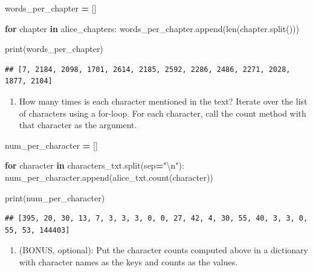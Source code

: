 \documentclass[
]{book}
\newenvironment{Shaded}{\begin{snugshade}}{\end{snugshade}}
\newcommand{\BuiltInTok}[1]{#1}
\newcommand{\CharTok}[1]{\textcolor[rgb]{0.31,0.60,0.02}{#1}}
\newcommand{\ControlFlowTok}[1]{\textcolor[rgb]{0.13,0.29,0.53}{\textbf{#1}}}
\newcommand{\KeywordTok}[1]{\textcolor[rgb]{0.13,0.29,0.53}{\textbf{#1}}}
\newcommand{\NormalTok}[1]{#1}
\newcommand{\OperatorTok}[1]{\textcolor[rgb]{0.81,0.36,0.00}{\textbf{#1}}}
\newcommand{\StringTok}[1]{\textcolor[rgb]{0.31,0.60,0.02}{#1}}
\providecommand{\tightlist}{%
  \setlength{\itemsep}{0pt}\setlength{\parskip}{0pt}}
\begin{document}
\begin{Shaded}
\begin{Highlighting}[]
\NormalTok{words\_per\_chapter }\OperatorTok{=}\NormalTok{ []}

\ControlFlowTok{for}\NormalTok{ chapter }\KeywordTok{in}\NormalTok{ alice\_chapters:}
\NormalTok{    words\_per\_chapter.append(}\BuiltInTok{len}\NormalTok{(chapter.split()))}

\BuiltInTok{print}\NormalTok{(words\_per\_chapter)}
\end{Highlighting}
\end{Shaded}

\begin{verbatim}
## [7, 2184, 2098, 1701, 2614, 2185, 2592, 2286, 2486, 2271, 2028, 1877, 2104]
\end{verbatim}

\begin{enumerate}
\def\labelenumi{\arabic{enumi}.}
\setcounter{enumi}{2}
\tightlist
\item
  How many times is each character mentioned in the text?
  Iterate over the list of characters using a for-loop.
  For each character, call the count method with that character as the argument.
\end{enumerate}

\begin{Shaded}
\begin{Highlighting}[]
\NormalTok{num\_per\_character }\OperatorTok{=}\NormalTok{ []}

\ControlFlowTok{for}\NormalTok{ character }\KeywordTok{in}\NormalTok{ characters\_txt.split(sep}\OperatorTok{=}\StringTok{"}\CharTok{\textbackslash{}n}\StringTok{"}\NormalTok{):}
\NormalTok{    num\_per\_character.append(alice\_txt.count(character))}

\BuiltInTok{print}\NormalTok{(num\_per\_character)}
\end{Highlighting}
\end{Shaded}

\begin{verbatim}
## [395, 20, 30, 13, 7, 3, 3, 3, 0, 0, 27, 42, 4, 30, 55, 40, 3, 3, 0, 55, 53, 144403]
\end{verbatim}

\begin{enumerate}
\def\labelenumi{\arabic{enumi}.}
\setcounter{enumi}{3}
\tightlist
\item
  (BONUS, optional): Put the character counts computed above in a
  dictionary with character names as the keys and counts as the values.
\end{enumerate}
\end{document}
